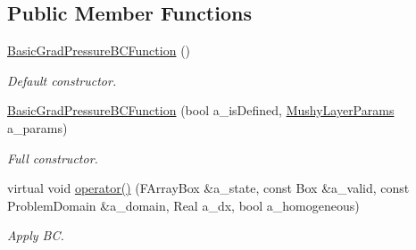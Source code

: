 \subsection*{Public Member Functions}
\begin{DoxyCompactItemize}
\item 
\hypertarget{class_basic_grad_pressure_b_c_function_a26372a752dd51acbaa659039b70980e4}{\hyperlink{class_basic_grad_pressure_b_c_function_a26372a752dd51acbaa659039b70980e4}{Basic\-Grad\-Pressure\-B\-C\-Function} ()}\label{class_basic_grad_pressure_b_c_function_a26372a752dd51acbaa659039b70980e4}

\begin{DoxyCompactList}\small\item\em Default constructor. \end{DoxyCompactList}\item 
\hypertarget{class_basic_grad_pressure_b_c_function_ae6c3e1cbb5fa5fc028d678ab12f133e6}{\hyperlink{class_basic_grad_pressure_b_c_function_ae6c3e1cbb5fa5fc028d678ab12f133e6}{Basic\-Grad\-Pressure\-B\-C\-Function} (bool a\-\_\-is\-Defined, \hyperlink{class_mushy_layer_params}{Mushy\-Layer\-Params} a\-\_\-params)}\label{class_basic_grad_pressure_b_c_function_ae6c3e1cbb5fa5fc028d678ab12f133e6}

\begin{DoxyCompactList}\small\item\em Full constructor. \end{DoxyCompactList}\item 
\hypertarget{class_basic_grad_pressure_b_c_function_a96a8f342fb3f7cfffe2998ec22f07bc9}{virtual void \hyperlink{class_basic_grad_pressure_b_c_function_a96a8f342fb3f7cfffe2998ec22f07bc9}{operator()} (F\-Array\-Box \&a\-\_\-state, const Box \&a\-\_\-valid, const Problem\-Domain \&a\-\_\-domain, Real a\-\_\-dx, bool a\-\_\-homogeneous)}\label{class_basic_grad_pressure_b_c_function_a96a8f342fb3f7cfffe2998ec22f07bc9}

\begin{DoxyCompactList}\small\item\em Apply B\-C. \end{DoxyCompactList}\end{DoxyCompactItemize}
